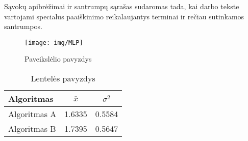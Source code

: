\documentclass[
    english, %
]{VUMIFPSkursinis}
\begin{document}
\printbibliography[heading=bibintoc]  %

Sąvokų apibrėžimai ir santrumpų sąrašas sudaromas tada, kai darbo tekste
vartojami specialūs paaiškinimo reikalaujantys terminai ir rečiau sutinkamos
santrumpos.


\begin{figure}[H]
    \centering
    \texttt{[image: img/MLP]}
    \caption{Paveikslėlio pavyzdys}
    \label{img:mlp}
\end{figure}



\begin{table}[H]\footnotesize
  \centering
  \caption{Lentelės pavyzdys}
  {\begin{tabular}{|l|c|c|} \hline
    Algoritmas & $\bar{x}$ & $\sigma^{2}$ \\
    \hline
    Algoritmas A  & 1.6335    & 0.5584       \\
    Algoritmas B  & 1.7395    & 0.5647       \\
    \hline
  \end{tabular}}
  \label{tab:table example}
\end{table}
\end{document}
